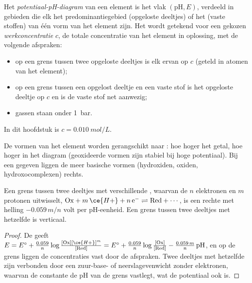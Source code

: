\begin{definition}\label{def:b1:e-ph-diagrams:e-ph-diagram}
Het \emph{potentiaal-pH-diagram} van een
element is het vlak $(\mathrm{pH}, E)$, verdeeld in gebieden die elk het
predominantiegebied (opgeloste deeltjes) of het  (vaste
stoffen) van één vorm van het element zijn. Het wordt getekend voor een
gekozen \emph{werkconcentratie} $c$, de totale
concentratie van het element in oplossing, met de volgende afspraken:
\begin{itemize}
  \item op een grens tussen twee opgeloste deeltjes is elk ervan op $c$
        (geteld in atomen van het element);
  \item op een grens tussen een opgelost deeltje en een vaste stof is het
        opgeloste deeltje op $c$ en is de vaste stof net aanwezig;
  \item gassen staan onder \qty{1}{bar}.
\end{itemize}
In dit hoofdstuk is $c = \qty{0.010}{mol/L}$.
\end{definition}

De vormen van het element worden gerangschikt naar : hoe
hoger het getal, hoe hoger in het diagram (geoxideerde vormen zijn
stabiel bij hoge potentiaal). Bij een gegeven  liggen de
meer basische vormen (hydroxiden, oxiden, hydroxocomplexen) rechts.

\begin{proposition}\label{prop:b1:e-ph-diagrams:boundary-slope}
Een grens tussen twee deeltjes met verschillende , waarvan
de  $n$ elektronen en $m$ protonen uitwisselt,
$\mathrm{Ox} + m\,\ce{H+} + n\,\mathrm{e^-} \rightleftharpoons \mathrm{Red} +
\cdots$, is een rechte met helling $-0.059\,m/n$ volt per pH-eenheid. Een
grens tussen twee deeltjes met hetzelfde  is verticaal.
\end{proposition}

\begin{proof}
De  geeft $E = E^\circ + \frac{0.059}{n}\log\frac{[\mathrm{Ox}]
[\ce{H+}]^m}{[\mathrm{Red}]} = E^\circ + \frac{0.059}{n}\log\frac{[\mathrm{Ox}]}
{[\mathrm{Red}]} - \frac{0.059\,m}{n}\,\mathrm{pH}$, en op de grens liggen
de concentraties vast door de afspraken. Twee deeltjes met hetzelfde
 zijn verbonden door een zuur-base- of neerslagevenwicht
zonder elektronen, waarvan de constante de pH van de grens vastlegt, wat
de potentiaal ook is.
\end{proof}

